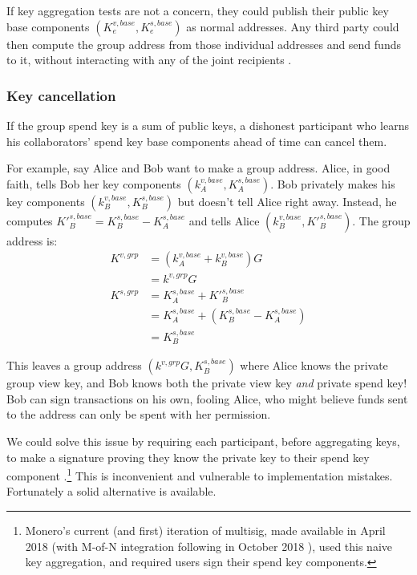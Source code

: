 If key aggregation tests are not a concern, they could publish their public key base components $(K^{v,base}_e,K^{s,base}_e)$ as normal addresses. Any third party could then compute the group address from those individual addresses and send funds to it, without interacting with any of the joint recipients \cite{maxwell2018simple-musig}.

\subsubsection*{Key cancellation}

If the group spend key is a sum of public keys, a dishonest participant who learns his collaborators' spend key base components ahead of time can cancel them.

For example, say Alice and Bob want to make a group address. Alice, in good faith, tells Bob her key components $(k^{v,base}_A,K^{s,base}_A)$. Bob privately makes his key components $(k^{v,base}_B,K^{s,base}_B)$ but doesn't tell Alice right away. Instead, he computes $K'^{s,base}_B = K^{s,base}_B - K^{s,base}_A$ and tells Alice $(k^{v,base}_B,K'^{s,base}_B)$. The group address is:\vspace{.175cm}
\begin{align*}
    K^{v,grp} &= (k^{v,base}_A + k^{v,base}_B) G \\
             &= k^{v,grp} G\\
    K^{s,grp} &= K^{s,base}_A + K'^{s,base}_B \\
             &= K^{s,base}_A + (K^{s,base}_B - K^{s,base}_A)\\
             &= K^{s,base}_B
\end{align*}

This leaves a group address $(k^{v,grp} G,K^{s,base}_B)$ where Alice knows the private group view key, and Bob knows both the private view key {\em and} private spend key! Bob can sign transactions on his own, fooling Alice, who might believe funds sent to the address can only be spent with her permission.

We could solve this issue by requiring each participant, before aggregating keys, to make a signature proving they know the private key to their spend key component \cite{old-multisig-mrl-note}.\footnote{Monero's current (and first) iteration of multisig, made available in April 2018 \cite{lithiumluna-v7} (with M-of-N integration following in October 2018 \cite{berylliumbullet-v8}), used this naive key aggregation, and required users sign their spend key components.} This is inconvenient and vulnerable to implementation mistakes. Fortunately a solid alternative is available.%


